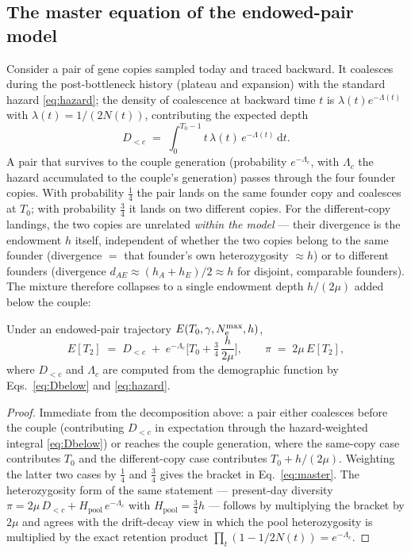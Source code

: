\subsection{The master equation of the endowed-pair model}\label{sec:master}
Consider a pair of gene copies sampled today and traced backward. It
coalesces during the post-bottleneck history (plateau and expansion) with
the standard hazard \eqref{eq:hazard}; the density of coalescence at
backward time $t$ is $\lambda(t)e^{-\Lambda(t)}$ with
$\lambda(t) = 1/(2N(t))$, contributing the expected depth
\begin{equation}\label{eq:Dbelow}
D_{<c} \;=\; \int_0^{T_0-1} t\,\lambda(t)\,e^{-\Lambda(t)}\,\mathrm{d}t .
\end{equation}
A pair that survives to the couple generation (probability
$e^{-\Lambda_c}$, with $\Lambda_c$ the hazard accumulated to the couple's
generation) passes through the four founder copies. With probability
$\tfrac14$ the pair lands on the same founder copy and coalesces at $T_0$;
with probability $\tfrac34$ it lands on two different copies. For the
different-copy landings, the two copies are unrelated \emph{within the
model} --- their divergence is the endowment $h$ itself, independent of
whether the two copies belong to the same founder (divergence $=$ that
founder's own heterozygosity $\approx h$) or to different founders
(divergence $d_{AE} \approx (h_A + h_E)/2 \approx h$ for disjoint,
comparable founders). The mixture therefore collapses to a single
endowment depth $h/(2\mu)$ added below the couple:

\begin{proposition}\label{prop:master}
Under an endowed-pair trajectory $E(T_0, \gamma, N_{\mathrm{e}}^{\max}, h)$,
\begin{equation}\label{eq:master}
\boxed{\;
E[T_2] \;=\; D_{<c} \;+\; e^{-\Lambda_c}\Big[T_0 + \tfrac{3}{4}\,\frac{h}{2\mu}\Big],
\qquad \pi \;=\; 2\mu\,E[T_2],
\;}
\end{equation}
where $D_{<c}$ and $\Lambda_c$ are computed from the demographic function
by Eqs.~\eqref{eq:Dbelow} and \eqref{eq:hazard}.
\end{proposition}

\begin{proof}
Immediate from the decomposition above: a pair either coalesces before the
couple (contributing $D_{<c}$ in expectation through the hazard-weighted
integral \eqref{eq:Dbelow}) or reaches the couple generation, where the
same-copy case contributes $T_0$ and the different-copy case contributes
$T_0 + h/(2\mu)$. Weighting the latter two cases by $\tfrac14$ and
$\tfrac34$ gives the bracket in Eq.~\eqref{eq:master}. The heterozygosity
form of the same statement --- present-day diversity
$\pi = 2\mu\,D_{<c} + H_{\mathrm{pool}}\,e^{-\Lambda_c}$ with
$H_{\mathrm{pool}} = \tfrac34 h$ --- follows by multiplying the bracket by
$2\mu$ and agrees with the drift-decay view in which the pool heterozygosity
is multiplied by the exact retention product
$\prod_t(1 - 1/2N(t)) = e^{-\Lambda_c}$.
\end{proof}

